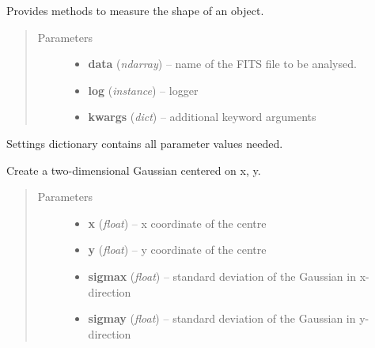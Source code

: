 \documentclass[a4paper,11pt,english]{sphinxmanual}
\begin{document}
\begin{fulllineitems}
\label{analysis:analysis.shape.shapeMeasurement}
Provides methods to measure the shape of an object.
\begin{quote}\begin{description}
\item[{Parameters}] \leavevmode\begin{itemize}
\item {} 
\textbf{data} (\emph{ndarray}) -- name of the FITS file to be analysed.

\item {} 
\textbf{log} (\emph{instance}) -- logger

\item {} 
\textbf{kwargs} (\emph{dict}) -- additional keyword arguments

\end{itemize}

\end{description}\end{quote}

Settings dictionary contains all parameter values needed.

\begin{fulllineitems}
\label{analysis:analysis.shape.shapeMeasurement.Gaussian2D}
Create a two-dimensional Gaussian centered on x, y.
\begin{quote}\begin{description}
\item[{Parameters}] \leavevmode\begin{itemize}
\item {} 
\textbf{x} (\emph{float}) -- x coordinate of the centre

\item {} 
\textbf{y} (\emph{float}) -- y coordinate of the centre

\item {} 
\textbf{sigmax} (\emph{float}) -- standard deviation of the Gaussian in x-direction

\item {} 
\textbf{sigmay} (\emph{float}) -- standard deviation of the Gaussian in y-direction

\end{itemize}


\end{description}
\end{quote}
\end{fulllineitems}
\end{fulllineitems}
\end{document}
